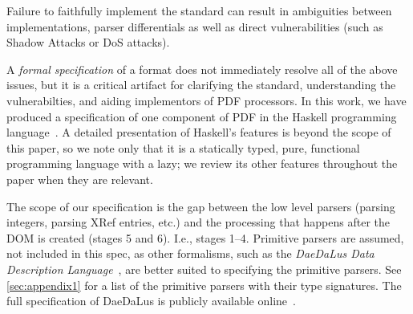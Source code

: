 Failure to faithfully implement the standard can result in ambiguities
between implementations, parser differentials as well as direct vulnerabilities (such as
Shadow Attacks or DoS attacks).


A \emph{formal specification} of a format does not immediately resolve
all of the above issues, but it is a critical artifact for clarifying
the standard, understanding the vulnerabilties, and aiding
implementors of PDF processors.
%
In this work, we have produced a specification of one component of PDF
in the Haskell programming language~\cite{jones2003haskell}.
%
A detailed presentation of Haskell's features is beyond the scope of
this paper, so we note only that it is a statically typed, pure,
functional programming language with a lazy;
%
we review its other features throughout the paper when they are
relevant.

The scope of our specification is the gap between the low level
parsers (parsing integers, parsing XRef entries, etc.) and the
processing that happens after the DOM is created (stages 5 and 6).
%
I.e., stages 1--4.
%
Primitive parsers are assumed, not included in this spec, as other
formalisms, such as the \emph{DaeDaLus Data Description
  Language}~\cite{daedalusrepo}, are better suited to specifying the
primitive parsers.
%
See \cref{sec:appendix1} for a list of the primitive parsers
with their type signatures.
%
The full specification of DaeDaLus is publicly available
online~\cite{daedalusrepo}.

